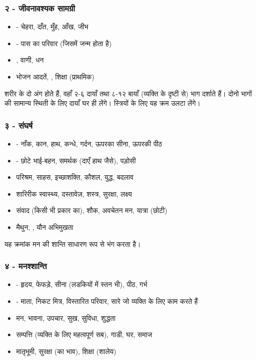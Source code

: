 \subsubsection{२ - जीवनावश्यक सामग्री}
\begin{itemize}
    \item {} - चेहरा,  दाँत, मुँह, आँख, जीभ
    \item {} - पास का परिवार (जिसमें जन्म होता है)
    \item {}, वाणी, धन
    \item भोजन आदतें, , शिक्षा (प्राथमिक)
\end{itemize}
 शरीर के दो अंग होते हैं, वहाँ २-६ दायाँ तथा ८-१२  बायाँ (व्यक्ति के दृष्टी से) भाग दर्शाते हैं। दोनो भागों की सामान्य स्थिती के लिए दायाँ घर ही लेंगे। स्त्रियों के लिए यह क्रम उलटा लेंगे।
\subsubsection{३ - संघर्ष}
\begin{itemize}
    \item {} - नाँक, कान, हाथ, कन्धे, गर्दन, ऊपरका सीना, ऊपरकी पीठ
    \item {} - छोटे भाई-बहन, समर्थक (दाएँ हाथ जैसे), पड़ोसी
    \item परिश्रम, साहस, इच्छाशक्ति, कौशल, युद्ध, बदलाव
    \item शारिरीक स्वास्थ्य, दस्तावेज़, शस्त्र, सुरक्षा, लक्ष्य
    \item संवाद (किसी भी प्रकार का), शौक, अवचेतन मन, यात्रा (छोटी)
    \item मैथुन, , यौन अभिमुखता
\end{itemize}
यह क्रमांक मन की शान्ति साधारण रूप से भंग करता है।
\subsubsection{४ - मनश्शान्ति}
\begin{itemize}
    \item {} - हृदय, फेफड़े, सीना (लडकियों में स्तन भी), पीठ, गर्भ
    \item {} - माता, निकट मित्र, विस्तारित परिवार, सारे जो व्यक्ति के लिए काम करते हैं
    \item मन, भावना, उपचार, सुख, सुविधा, शुद्धता
    \item सम्पत्ति (व्यक्ति के लिए महत्वपूर्ण सब), गाडी, घर, समाज
    \item मातृभूमी, सुरक्षा (का भाव), शिक्षा (शालेय)
\end{itemize}

